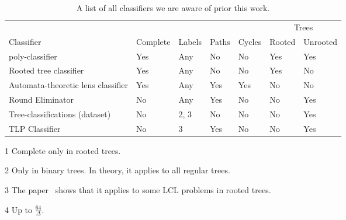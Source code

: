 \begin{table}[H]
\centering
\begin{threeparttable}[t]
\begin{adjustbox}{width={\textwidth},keepaspectratio}%
\begin{tabular}{l l l l l l l}
    \toprule
    &&&&& \multicolumn{2}{c}{Trees} \\
    \cmidrule{6-7}
    Classifier & Complete & Labels & Paths & Cycles &Rooted & Unrooted \\\midrule
    poly-classifier \cite{PolyClassifier2022, DBLP:journals/corr/abs-2202-08544}
    & Yes\tnote{1} & Any & No & No & Yes\tnote{2} & Yes\tnote{2} \\
    Rooted tree classifier \cite{RootedTreeClassifier2021, DBLP:conf/podc/Balliu0OSST21}
    & Yes & Any & No & No & Yes\tnote{2} & No \\
    Automata-theoretic lens classifier \cite{CyclePathClassifier2020, DBLP:conf/sirocco/ChangSS21}
    & Yes & Any & Yes & Yes & No\tnote{3} & No \\
    Round Eliminator \cite{DBLP:conf/podc/Olivetti20, OlivettiRoundEliminatorGithub, DBLP:conf/podc/Brandt19}
    & No & Any\tnote{4} & Yes & No &  No & Yes \\
    Tree-classifications (dataset) \cite{TreeClassifications2020}
    & No & 2, 3 & No & No & No  & Yes \\
    TLP Classifier \cite{RocherTlpClassifier2020, Rocher2020}
    & No & 3 & Yes & No & No  & Yes \\ \bottomrule
\end{tabular}%
\end{adjustbox}
\begin{tablenotes}
    \footnotesize
    \item[1] Complete only in rooted trees.
    \item[2] Only in binary trees. In theory, it applies to all regular trees.
    \item[3] The paper~\cite{DBLP:conf/sirocco/ChangSS21} shows that it applies to some LCL problems in rooted trees.
    \item[4] Up to \(\frac{64}{\Delta}\).
\end{tablenotes}
\end{threeparttable}
\caption{A list of all classifiers we are aware of prior this work.} \label{tbl:classifiers}
\end{table}

